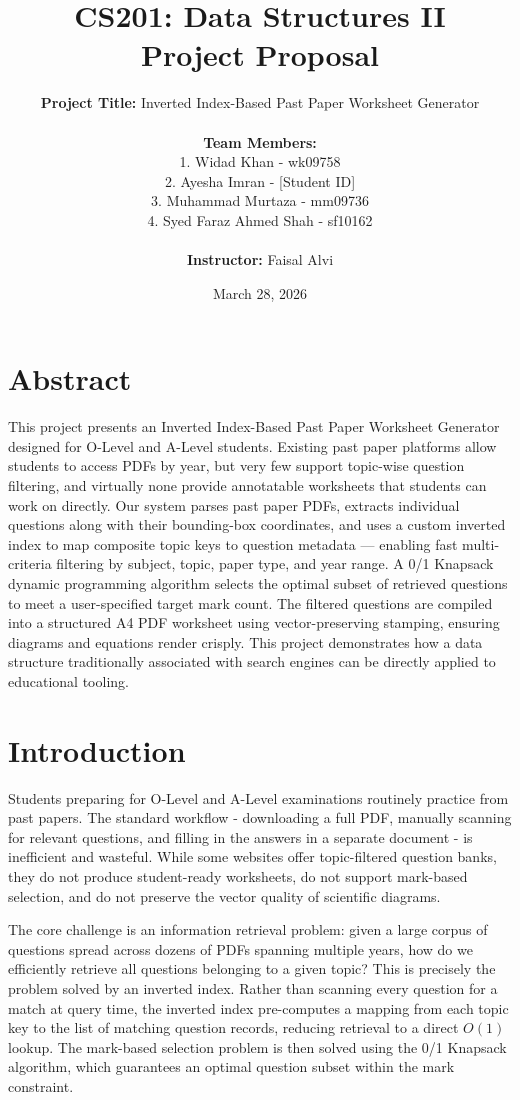 \documentclass[10pt]{article}
\title{\textbf{CS201: Data Structures II \\ Project Proposal}}
\date{March 28, 2026}
\author{
    \textbf{Project Title:} Inverted Index-Based Past Paper Worksheet Generator \\
    \\ \textbf{Team Members:} \\
    1. Widad Khan - wk09758 \\
    2. Ayesha Imran - [Student ID] \\
    3. Muhammad Murtaza - mm09736 \\
    4. Syed Faraz Ahmed Shah - sf10162 \\
    \\ \textbf{Instructor:} Faisal Alvi
}
\begin{document}
\maketitle

\section{Abstract}
This project presents an Inverted Index-Based Past Paper Worksheet Generator designed for O-Level and A-Level students. Existing past paper platforms allow students to access PDFs by year, but very few support topic-wise question filtering, and virtually none provide annotatable worksheets that students can work on directly. Our system parses past paper PDFs, extracts individual questions along with their bounding-box coordinates, and uses a custom inverted index to map composite topic keys to question metadata --- enabling fast multi-criteria filtering by subject, topic, paper type, and year range. A 0/1 Knapsack dynamic programming algorithm selects the optimal subset of retrieved questions to meet a user-specified target mark count. The filtered questions are compiled into a structured A4 PDF worksheet using vector-preserving stamping, ensuring diagrams and equations render crisply. This project demonstrates how a data structure traditionally associated with search engines can be directly applied to educational tooling.

\section{Introduction}
Students preparing for O-Level and A-Level examinations routinely practice from past papers. The standard workflow - downloading a full PDF, manually scanning for relevant questions, and filling in the answers in a separate document - is inefficient and wasteful. While some websites offer topic-filtered question banks, they do not produce student-ready worksheets, do not support mark-based selection, and do not preserve the vector quality of scientific diagrams.

The core challenge is an information retrieval problem: given a large corpus of questions spread across dozens of PDFs spanning multiple years, how do we efficiently retrieve all questions belonging to a given topic? This is precisely the problem solved by an inverted index. Rather than scanning every question for a match at query time, the inverted index pre-computes a mapping from each topic key to the list of matching question records, reducing retrieval to a direct $O(1)$ lookup. The mark-based selection problem is then solved using the 0/1 Knapsack algorithm, which guarantees an optimal question subset within the mark constraint.
\end{document}
